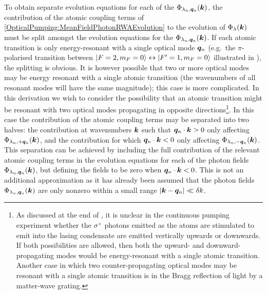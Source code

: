To obtain separate evolution equations for each of the $\Phi_{\lambda_n, \bm{q}_n}(\bm{k})$, the contribution of the atomic coupling terms of \eqref{OpticalPumping:MeanFieldPhotonRWAEvolution} to the evolution of $\Phi_\lambda(\bm{k})$ must be split amongst the evolution equations for the $\Phi_{\lambda_n, \bm{q}_n}(\bm{k})$.  If each atomic transition is only energy-resonant with a single optical mode $\bm{q}_n$ (e.g.\ the $\pi$-polarised transition between ${\left|F=2, m_F=0\right>} \leftrightarrow {\ensuremath{\left|F'=1, m_F=0\right>}}$ illustrated in ), the splitting is obvious.  It is however possible that two or more optical modes may be energy resonant with a single atomic transition (the wavenumbers of all resonant modes will have the same magnitude); this case is more complicated.  In this derivation we wish to consider the possibility that an atomic transition might be resonant with two optical modes propagating in opposite directions\footnote{As discussed at the end of , it is unclear in the continuous pumping experiment whether the $\sigma^+$ photons emitted as the atoms are stimulated to emit into the lasing condensate are emitted vertically upwards or downwards.  If both possibilities are allowed, then both the upward- and downward-propagating modes would be energy-resonant with a single atomic transition.  Another case in which two counter-propagating optical modes may be resonant with a single atomic transition is in the Bragg reflection of light by a matter-wave grating.}.  In this case the contribution of the atomic coupling terms may be separated into two halves: the contribution at wavenumbers $\bm{k}$ such that $\bm{q}_n \cdot \bm{k} > 0$ only affecting $\Phi_{\lambda_n, +\bm{q}_n}(\bm{k})$, and the contribution for which $\bm{q}_n \cdot \bm{k} < 0$ only affecting $\Phi_{\lambda_n, -\bm{q}_n}(\bm{k})$.  This separation can be achieved by including the full contribution of the relevant atomic coupling terms in the evolution equations for each of the photon fields $\Phi_{\lambda_n, \bm{q}_n}(\bm{k})$, but defining the fields to be zero when $\bm{q}_n \cdot \bm{k} < 0$.  This is not an additional approximation as it has already been assumed that the photon fields $\Phi_{\lambda_n, \bm{q}_n}(\bm{k})$ are only nonzero within a small range $\left|\bm{k} - \bm{q}_n\right|\ll \delta k$.  


